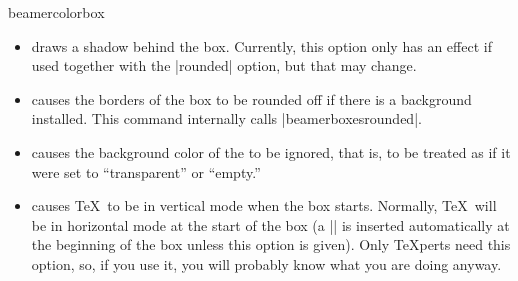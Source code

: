 \begin{environment}{{beamercolorbox}}
\begin{itemize}
    A typical example usage of this option arises when you insert a
    box with a coloured background in the middle of normal text. In
    this case, if the background color is set, you would like a
    background to be drawn behind the text \emph{and} you would like a
    certain extra space around this text (the background should not
    stop immediately at the borders of the text, this looks silly)
    \emph{and} you would like the normal text always to be at the same
    horizontal position, independently of whether a background is
    present or not. In this case, using |colsep*=4pt| is a good
    option.
  \item {} draws a shadow
    behind the box. Currently, this option only has an effect if
    used together with the |rounded| option, but that may change.
  \item {} causes the
    borders of the box to be rounded off if there is a background
    installed. This command internally calls |beamerboxesrounded|.
  \item {} causes the background color of the
     to be ignored, that is, to be treated as if it
    were set to ``transparent'' or ``empty.''
  \item {} causes \TeX\ to be in vertical mode when the
    box starts. Normally, \TeX\ will be in horizontal mode at the
    start of the box (a |\leavevmode| is inserted automatically at the
    beginning of the box unless this option is given). Only
    \TeX perts need this option, so, if you use it, you will
    probably know what you are doing anyway.
  \end{itemize}
\end{environment}


